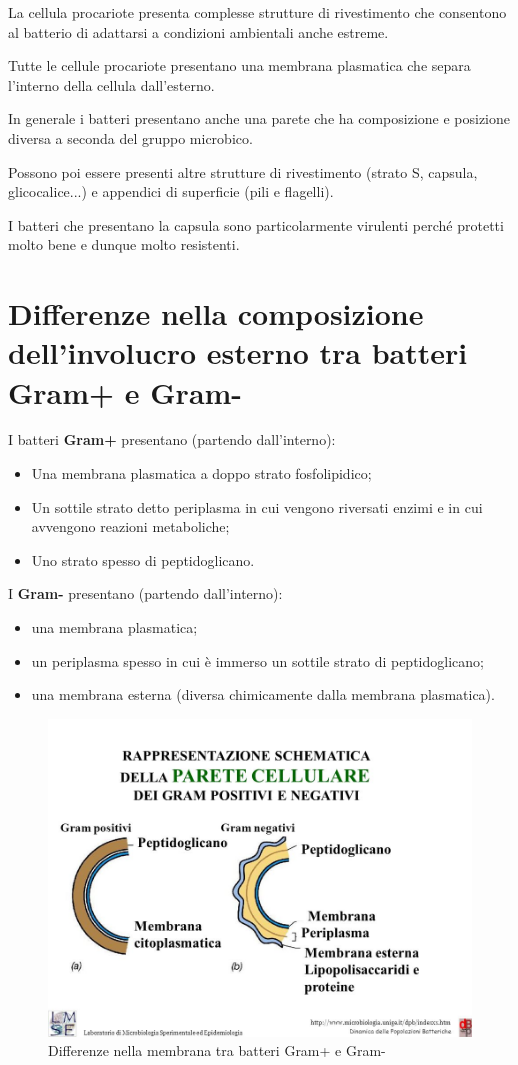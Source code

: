 \documentclass[11pt]{book}
\begin{document}
La cellula procariote presenta complesse strutture di rivestimento che consentono al batterio di adattarsi a condizioni ambientali anche estreme.

Tutte le cellule procariote presentano una membrana plasmatica che separa l'interno della cellula dall'esterno. 

In generale i batteri presentano anche una parete che ha composizione e posizione diversa a seconda del gruppo microbico.

Possono poi essere presenti altre strutture di rivestimento (strato S, capsula, glicocalice...) e appendici di superficie (pili e flagelli).

I batteri che presentano la capsula sono particolarmente virulenti perché protetti molto bene e dunque molto resistenti.

\section{Differenze nella composizione dell'involucro esterno tra batteri Gram+ e Gram-}
I batteri \textbf{Gram+} presentano (partendo dall'interno):
\begin{itemize}
\item Una membrana plasmatica a doppo strato fosfolipidico;
\item Un sottile strato detto periplasma in cui vengono riversati enzimi e in cui avvengono reazioni metaboliche;
\item Uno strato spesso di peptidoglicano.
\end{itemize}

I \textbf{Gram-} presentano (partendo dall'interno):
\begin{itemize}
\item una membrana plasmatica;
\item un periplasma spesso in cui è immerso un sottile strato di peptidoglicano;
\item una membrana esterna (diversa chimicamente dalla membrana plasmatica).
\end{itemize}

\begin{figure}[htp]
\centering
\includegraphics[scale=0.40]{img/parete_cellulare.jpg}
\caption{Differenze nella membrana tra batteri Gram+ e Gram-}
\label{parete_cellulare}
\end{figure}
\end{document}

